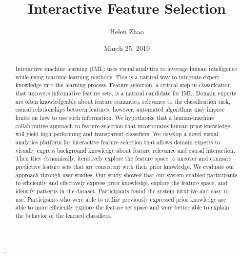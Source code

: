 \documentclass[]{cwru}
\title{Interactive Feature Selection}
\author{Helen Zhao}
\date{March 25, 2019}
\begin{document}


\maketitle
\makeapprovalsheet

\frontmatter
\tableofcontents

\cleardoublepage
{}
{}
\listoftables

\cleardoublepage
{}
{}
\listoffigures



\begin{abstract}
Interactive machine learning (IML) uses visual analytics to leverage human intelligence while using machine learning methods. This is a natural way to integrate expert knowledge into the learning process. Feature selection, a critical step in classification that uncovers informative feature sets, is a natural candidate for IML. Domain experts are often knowledgeable about feature semantics, relevance to the classification task, causal relationships between features; however, automated algorithms may impose limits on how to use such information. We hypothesize that a human-machine collaborative approach to feature selection that incorporates human prior knowledge will yield high performing and transparent classifiers. We develop a novel visual analytics platform for interactive feature selection that allows domain experts to visually express background knowledge about feature relevance and causal interaction. Then they dynamically, iteratively explore the feature space to uncover and compare predictive feature sets that are consistent with their prior knowledge. We evaluate our approach through user studies. Our study showed that our system enabled participants to efficiently and effectively express prior knowledge, explore the feature space, and identify patterns in the dataset. Participants found the system intuitive and easy to use. Participants who were able to utilize previously expressed prior knowledge are able to more efficiently explore the feature set space and were better able to explain the behavior of the learned classifiers. 

\end{abstract}

\mainmatter


\cleardoublepage

\cleardoublepage

\cleardoublepage

\cleardoublepage

\cleardoublepage
\backmatter
\cleardoublepage
{}-


\end{document}
